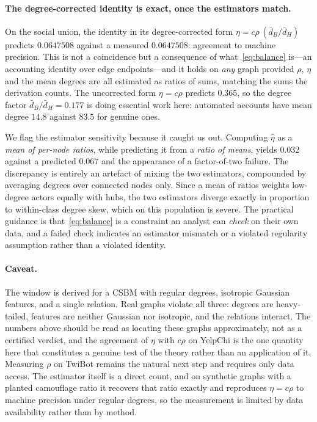 \documentclass[../elsevier.tex]{subfiles}
\begin{document}
\paragraph{The degree-corrected identity is exact, once the estimators match.}
\label{sec:balance-check}
On the social union, the identity in its degree-corrected form
$\eta = c\rho\,(\bar d_B/\bar d_H)$ predicts $0.0647508$ against a measured
$0.0647508$: agreement to machine precision. This is not a coincidence but a
consequence of what~\eqref{eq:balance} is---an accounting identity over edge
endpoints---and it holds on \emph{any} graph provided $\rho$, $\eta$ and the mean
degrees are all estimated as ratios of sums, matching the sums the derivation counts.
The uncorrected form $\eta = c\rho$ predicts $0.365$, so the degree factor
$\bar d_B/\bar d_H = 0.177$ is doing essential work here: automated accounts have mean
degree $14.8$ against $83.5$ for genuine ones.

We flag the estimator sensitivity because it caught us out. Computing $\hat\eta$ as a
\emph{mean of per-node ratios}, while predicting it from a \emph{ratio of means},
yields $0.032$ against a predicted $0.067$ and the appearance of a factor-of-two
failure. The discrepancy is entirely an artefact of mixing the two estimators, com\-pounded
by averaging degrees over connected nodes only. Since a mean of ratios weights
low-degree actors equally with hubs, the two estimators diverge exactly in proportion
to within-class degree skew, which on this population is severe. The practical
guidance is that~\eqref{eq:balance} is a constraint an analyst can \emph{check} on
their own data, and a failed check indicates an estimator mismatch or a violated
regularity assumption rather than a violated identity.

\paragraph{Caveat.}
The window is derived for a CSBM with regular degrees, isotropic Gaussian features,
and a single relation. Real graphs violate all three: degrees are heavy-tailed,
features are neither Gaussian nor isotropic, and the relations interact. The
numbers above should be read as locating these graphs approximately, not as a
certified verdict, and the agreement of $\eta$ with $c\rho$ on YelpChi is the one
quantity here that constitutes a genuine test of the theory rather than an
application of it. Measuring $\rho$ on TwiBot remains the natural next step and
requires only data access. The estimator itself is a direct count, and on synthetic
graphs with a planted camouflage ratio it recovers that ratio exactly and reproduces
$\eta = c\rho$ to machine precision under regular degrees, so the measurement is
limited by data availability rather than by method.
\end{document}
